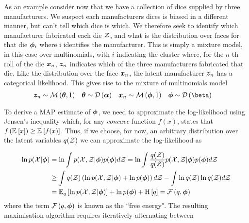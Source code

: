 As an example consider now that we have a collection of dice supplied by three manufacturers. We suspect each manufacturers dices is biased in a different manner, but can't tell which dice is which. We therefore seek to identify which manufacturer fabricated each die ${ \mathcal{Z} }$, and what is the distribution over faces for that die ${ \bm \phi }_i$ where i identifies the manufacturer. This is simply a mixture model, in this case over multinomials, with $i$ indicating the cluster where, for the $n$-th roll of the die $\bm x_n$, $\bm z_n$ indicates which of the three manufacturers fabricated that die. Like the distribution over the face $\bm x_n$, the latent manufacturer $\bm z_n$ has a categorical likelihood. This gives rise to the mixture of multinomials model\cite{Nigam2000}
\begin{align*}
\vv{z}_n & \sim \muln{\vv{\theta}}{1} & \vv{\theta} & \sim \dir{\vv{\alpha}} &
\vv{x}_n & \sim \muln{\param}{1} & \param & \sim \dir{\vv{\beta}}
\end{align*}

To derive a MAP estimate of ${ \bm \phi }$, we need to approximate the log-likelihood using Jensen's inequality which, for any \emph{concave} function $f(x)$, states that $f\left(\mathbb{E}_{ {  } }\left[ x \right]\right) \geq \mathbb{E}_{ {  } }\left[ f(x) \right]$. Thus, if we choose, for now, an arbitrary distribution over the latent variables $q({ \mathcal{Z} })$ we can approximate the log-likelihood as

\begin{align*}
\ln p({ \mathcal{X} }|{ \bm \phi }) & = \ln \int { p( { \mathcal{X} } ,  { \mathcal{Z} } |  {  \bm \phi  } ) } p({ \bm \phi }) d{ \mathcal{Z} } 
 = \ln \int \frac{q({ \mathcal{Z} })}{q({ \mathcal{Z} })} { p({ \mathcal{X} }, { \mathcal{Z} } | { \bm \phi }) } p({ \bm \phi }) d{ \mathcal{Z} } \\
& \geq \int  q({ \mathcal{Z} }) \left({ \ln { p( { \mathcal{X} } ,  { \mathcal{Z} } |  {  \bm \phi  } ) } } + \ln p({ \bm \phi })\right) d{ \mathcal{Z} }
  -     \int \ln q({ \mathcal{Z} }) \ln q({ \mathcal{Z} }) d{ \mathcal{Z} } \\
& = { \mathbb{E}_{ { {q} } }\left[ { \ln { p( { \mathcal{X} } ,  { \mathcal{Z} } |  {  \bm \phi  } ) } } \right] } + \ln p({ \bm \phi }) + \text{H} \left[ q \right] = { \mathcal{F}\left( {q, { \bm \phi }} \right) }
\end{align*}
where the term ${ \mathcal{F}\left( {q, { \bm \phi }} \right) }$ is known as the ``free energy". The resulting maximisation algorithm requires iteratively alternating between

